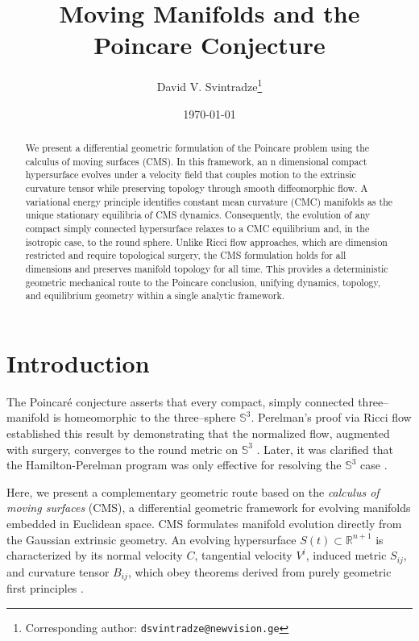 \documentclass[11pt]{article}
\title{Moving Manifolds and the Poincare Conjecture}
\author{David V. Svintradze\thanks{Corresponding author: \texttt{dsvintradze@newvision.ge}}}
\affil{New Vision University, Tbilisi, Georgia}
\date{\today}
\theoremstyle{definition}
\theoremstyle{plain}
\theoremstyle{remark}
\begin{document}
\maketitle
\begin{abstract}
We present a differential geometric formulation of the Poincare problem using the calculus of moving surfaces (CMS). In this framework, an n dimensional compact hypersurface evolves under a velocity field that couples motion to the extrinsic curvature tensor while preserving topology through smooth diffeomorphic flow. A variational energy principle identifies constant mean curvature (CMC) manifolds as the unique stationary equilibria of CMS dynamics. Consequently, the evolution of any compact simply connected hypersurface relaxes to a CMC equilibrium and, in the isotropic case, to the round sphere.
Unlike Ricci flow approaches, which are dimension restricted and require topological surgery, the CMS formulation holds for all dimensions and preserves manifold topology for all time. This provides a deterministic geometric mechanical route to the Poincare conclusion, unifying dynamics, topology, and equilibrium geometry within a single analytic framework. 
\end{abstract}

\section{Introduction}
The Poincaré conjecture asserts that every compact, simply connected three–manifold is homeomorphic to the three–sphere $\mathbb{S}^3$.  
Perelman’s proof via Ricci flow established this result by demonstrating that the normalized flow, augmented with surgery, converges to the round metric on $\mathbb{S}^3$ \cite{Perelman2002, Perelman2003a, Perelman2003b, Morgan2006}. Later, it was clarified that the Hamilton-Perelman program was only effective for resolving the $\mathbb{S}^3$ case \cite{Morgan2006}.

Here, we present a complementary geometric route based on the \emph{calculus of moving surfaces} (CMS), a differential geometric framework for evolving manifolds embedded in Euclidean space.  
CMS formulates manifold evolution directly from the Gaussian extrinsic geometry.  
An evolving hypersurface $S(t)\subset\mathbb{R}^{n+1}$ is characterized by its normal velocity $C$, tangential velocity $V^i$, induced metric $S_{ij}$, and curvature tensor $B_{ij}$, which obey theorems derived from purely geometric first principles \cite{Grinfeld2013}.
\end{document}

